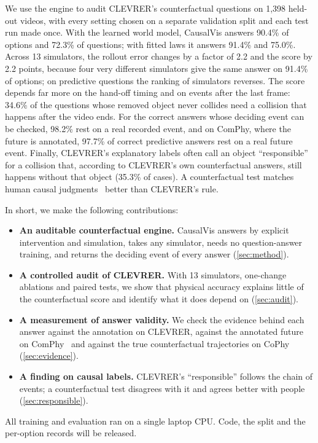 \IfFileExists{TMLR}{\documentclass[10pt]{article}}%
\newcommand{\sys}{CausalVis}
\begin{document}
We use the engine to audit CLEVRER's counterfactual questions on 1,398 held-out videos, with every setting chosen on a separate validation split and each test run made once.
With the learned world model, \sys{} answers 90.4\% of options and 72.3\% of questions; with fitted laws it answers 91.4\% and 75.0\%.
Across 13 simulators, the rollout error changes by a factor of 2.2 and the score by 2.2 points, because four very different simulators give the same answer on 91.4\% of options; on predictive questions the ranking of simulators reverses.
The score depends far more on the hand-off timing and on events after the last frame: 34.6\% of the questions whose removed object never collides need a collision that happens after the video ends.
For the correct answers whose deciding event can be checked, 98.2\% rest on a real recorded event, and on ComPhy, where the future is annotated, 97.7\% of correct predictive answers rest on a real future event.
Finally, CLEVRER's explanatory labels often call an object ``responsible'' for a collision that, according to CLEVRER's own counterfactual answers, still happens without that object (35.3\% of cases).
A counterfactual test matches human causal judgments~\cite{mao2022clevrerhumans} better than CLEVRER's rule.

In short, we make the following contributions:
\begin{itemize}
\item \textbf{An auditable counterfactual engine.} \sys{} answers by explicit intervention and simulation, takes any simulator, needs no question-answer training, and returns the deciding event of every answer (\cref{sec:method}).
\item \textbf{A controlled audit of CLEVRER.} With 13 simulators, one-change ablations and paired tests, we show that physical accuracy explains little of the counterfactual score and identify what it does depend on (\cref{sec:audit}).
\item \textbf{A measurement of answer validity.} We check the evidence behind each answer against the annotation on CLEVRER, against the annotated future on ComPhy~\cite{chen2022comphy} and against the true counterfactual trajectories on CoPhy~\cite{baradel2020cophy} (\cref{sec:evidence}).
\item \textbf{A finding on causal labels.} CLEVRER's ``responsible'' follows the chain of events; a counterfactual test disagrees with it and agrees better with people (\cref{sec:responsible}).
\end{itemize}
All training and evaluation ran on a single laptop CPU. Code, the split and the per-option records will be released.
\end{document}
